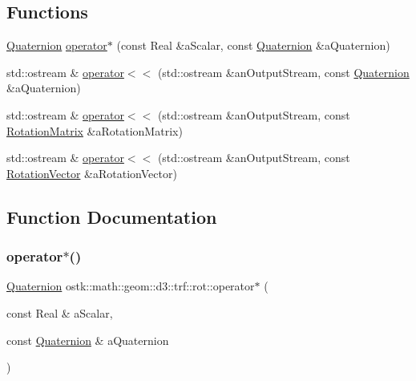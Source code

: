 \subsection*{Functions}
\begin{DoxyCompactItemize}
\item 
\hyperlink{classostk_1_1math_1_1geom_1_1d3_1_1trf_1_1rot_1_1_quaternion}{Quaternion} \hyperlink{namespaceostk_1_1math_1_1geom_1_1d3_1_1trf_1_1rot_a31ab86b0f429a33d76fbab4bf520417b}{operator$\ast$} (const Real \&a\+Scalar, const \hyperlink{classostk_1_1math_1_1geom_1_1d3_1_1trf_1_1rot_1_1_quaternion}{Quaternion} \&a\+Quaternion)
\item 
std\+::ostream \& \hyperlink{namespaceostk_1_1math_1_1geom_1_1d3_1_1trf_1_1rot_af606d732f296e6b0a7e35d5023a59915}{operator$<$$<$} (std\+::ostream \&an\+Output\+Stream, const \hyperlink{classostk_1_1math_1_1geom_1_1d3_1_1trf_1_1rot_1_1_quaternion}{Quaternion} \&a\+Quaternion)
\item 
std\+::ostream \& \hyperlink{namespaceostk_1_1math_1_1geom_1_1d3_1_1trf_1_1rot_a44f63ac9ffcaf5993609c3229eb2b91b}{operator$<$$<$} (std\+::ostream \&an\+Output\+Stream, const \hyperlink{classostk_1_1math_1_1geom_1_1d3_1_1trf_1_1rot_1_1_rotation_matrix}{Rotation\+Matrix} \&a\+Rotation\+Matrix)
\item 
std\+::ostream \& \hyperlink{namespaceostk_1_1math_1_1geom_1_1d3_1_1trf_1_1rot_a8079bca5341bbc79c343ef3be7e49d7b}{operator$<$$<$} (std\+::ostream \&an\+Output\+Stream, const \hyperlink{classostk_1_1math_1_1geom_1_1d3_1_1trf_1_1rot_1_1_rotation_vector}{Rotation\+Vector} \&a\+Rotation\+Vector)
\end{DoxyCompactItemize}


\subsection{Function Documentation}
\mbox{\label{namespaceostk_1_1math_1_1geom_1_1d3_1_1trf_1_1rot_a31ab86b0f429a33d76fbab4bf520417b}} 
\subsubsection{\texorpdfstring{operator$\ast$()}{operator*()}}
{\footnotesize\ttfamily \hyperlink{classostk_1_1math_1_1geom_1_1d3_1_1trf_1_1rot_1_1_quaternion}{Quaternion} ostk\+::math\+::geom\+::d3\+::trf\+::rot\+::operator$\ast$ (\begin{DoxyParamCaption}\item[{const Real \&}]{a\+Scalar,  }\item[{const \hyperlink{classostk_1_1math_1_1geom_1_1d3_1_1trf_1_1rot_1_1_quaternion}{Quaternion} \&}]{a\+Quaternion }\end{DoxyParamCaption})}

